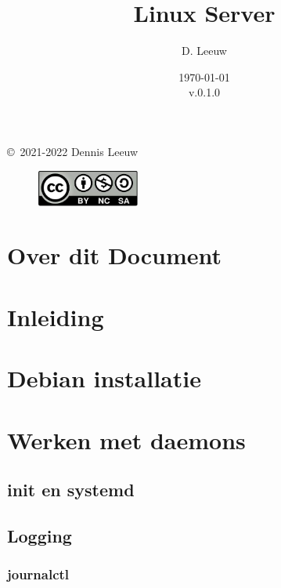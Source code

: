 \documentclass[a4paper,12pt,twoside,openright,titlepage]{book}
\author{D. Leeuw}
\title{Linux Server}
\date{\today\\v.0.1.0}
\begin{document}

\maketitle

\copyright\ 2021-2022 Dennis Leeuw\\

\begin{figure}
\includegraphics[width=0.3\textwidth]{CC-BY-SA-NC.png}
\end{figure}

\bigskip




\frontmatter
\chapter{Over dit Document}



\tableofcontents

\mainmatter
\chapter{Inleiding}


\chapter{Debian installatie}


\chapter{Werken met daemons}

\section{init en systemd}

\section{Logging}
\subsection{journalctl}

\end{document}
